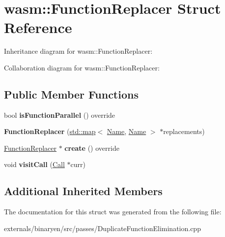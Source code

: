 \hypertarget{structwasm_1_1_function_replacer}{}\section{wasm\+:\+:Function\+Replacer Struct Reference}
\label{structwasm_1_1_function_replacer}


Inheritance diagram for wasm\+:\+:Function\+Replacer\+:


Collaboration diagram for wasm\+:\+:Function\+Replacer\+:
\subsection*{Public Member Functions}
\begin{DoxyCompactItemize}
\item 
\mbox{\label{structwasm_1_1_function_replacer_a07c9476d3eb223e14851a4376941b5d4}} 
bool {\bfseries is\+Function\+Parallel} () override
\item 
\mbox{\label{structwasm_1_1_function_replacer_a995dbd535458869aff682dbc2a0031eb}} 
{\bfseries Function\+Replacer} (\mbox{\hyperlink{classstd_1_1map}{std\+::map}}$<$ \mbox{\hyperlink{structwasm_1_1_name}{Name}}, \mbox{\hyperlink{structwasm_1_1_name}{Name}} $>$ $\ast$replacements)
\item 
\mbox{\label{structwasm_1_1_function_replacer_a1948b78d625a5cd9d0f5c129c0f20ea0}} 
\mbox{\hyperlink{structwasm_1_1_function_replacer}{Function\+Replacer}} $\ast$ {\bfseries create} () override
\item 
\mbox{\label{structwasm_1_1_function_replacer_a6aab41d97e33fa4bc8da82cceb16b28d}} 
void {\bfseries visit\+Call} (\mbox{\hyperlink{classwasm_1_1_call}{Call}} $\ast$curr)
\end{DoxyCompactItemize}
\subsection*{Additional Inherited Members}


The documentation for this struct was generated from the following file\+:\begin{DoxyCompactItemize}
\item 
externals/binaryen/src/passes/Duplicate\+Function\+Elimination.\+cpp\end{DoxyCompactItemize}
